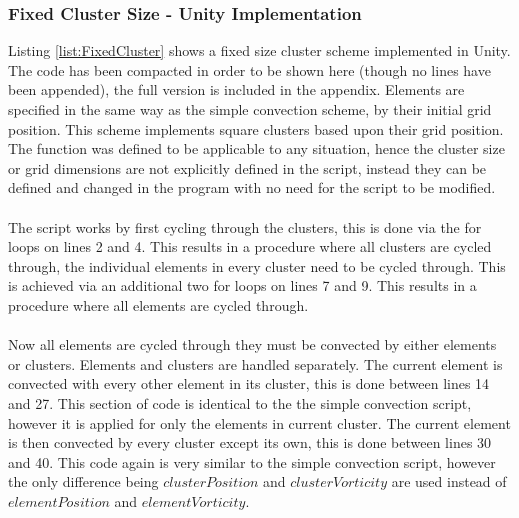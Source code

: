 \subsubsection{Fixed Cluster Size - Unity Implementation}
Listing \ref{list:FixedCluster} shows a fixed size cluster scheme implemented in Unity. The code has been compacted in order to be shown here (though no lines have been appended), the full version is included in the appendix. Elements are specified in the same way as the simple convection scheme, by their initial grid position. This scheme implements square clusters based upon their grid position. The function was defined to be applicable to any situation, hence the cluster size or grid dimensions are not explicitly defined in the script, instead they can be defined and changed in the program with no need for the script to be modified.
\\\\
The script works by first cycling through the clusters, this is done via the for loops on lines 2 and 4. This results in a procedure where all clusters are cycled through, the individual elements in every cluster need to be cycled through. This is achieved via an additional two for loops on lines 7 and 9. This results in a procedure where all elements are cycled through.
\\\\
Now all elements are cycled through they must be convected by either elements or clusters. Elements and clusters are handled separately. The current element is convected with every other element in its cluster, this is done between lines 14 and 27. This section of code is identical to the the simple convection script, however it is applied for only the elements in current cluster. The current element is then convected by every cluster except its own, this is done between lines 30 and 40. This code again is very similar to the simple convection script, however the only difference being $clusterPosition$ and $clusterVorticity$ are used instead of $elementPosition$ and $elementVorticity$.


